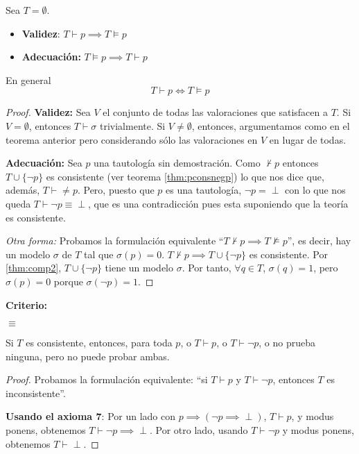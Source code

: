 \begin{theorem}	Sea $T = \emptyset$.
	\begin{itemize}
		\item \textbf{Validez}:
		$T \vdash p \implies T \vDash p$
		\item \textbf{Adecuación:}
		$T \vDash p \implies T \vdash p$
	\end{itemize}
	En general $$T\vdash p \iff T\vDash p$$
\end{theorem}
\begin{proof}

	\textbf{Validez:} Sea $V$ el conjunto de todas las valoraciones que satisfacen a $T$. Si $V=\emptyset$, entonces $T\vdash \sigma$ trivialmente. Si $V\neq \emptyset$, entonces, argumentamos como en el teorema anterior pero considerando sólo las valoraciones en $V$ en lugar de todas.

	\textbf{Adecuación:} Sea $p$ una tautología sin demostración. Como $\nvdash p$ entonces $T\cup\{\neg p\}$ es consistente (ver teorema \ref{thm:pconsnegp}) lo que nos dice que, además, $T \vdash \neq p$. Pero, puesto que $p$ es una tautología, $\neg p = \perp$ con lo que nos queda $T\vdash \neg p\equiv \perp$, que es una contradicción pues esta suponiendo que la teoría es consistente.

	\textit{Otra forma:} Probamos la formulación equivalente ``$T\nvdash p \implies T\nvDash p$'', es decir, hay un modelo $\sigma$ de $T$ tal que $\sigma(p) = 0$. $T\nvdash p \implies T\cup\{\neg p\}$ es consistente. Por \ref{thm:comp2}, $T\cup\{\neg p\}$ tiene un modelo $\sigma$. Por tanto, $\forall q\in T$, $\sigma(q) = 1$, pero $\sigma(p) = 0$ porque $\sigma(\neg p) = 1$.

\end{proof}

\noindent\textbf{Criterio: }\mbox{}

	 $\equiv$


\begin{theorem}
	Si $T$ es consistente, entonces, para toda $p$, o $T\vdash p$, o $T\vdash \neg p$, o no prueba ninguna, pero no puede probar ambas.
\end{theorem}
\begin{proof}\mbox{}

	Probamos la formulación equivalente: ``si $T\vdash p$ y $T\vdash \neg p$, entonces $T$ es inconsistente''.

	\textbf{Usando el axioma 7}:
	Por un lado con $p\implies(\neg p \implies \perp)$, $T\vdash p$, y modus ponens, obtenemos $T\vdash \neg p \implies \perp$. Por otro lado, usando $T\vdash \neg p$ y modus ponens, obtenemos $T\vdash\perp$.
\end{proof}

